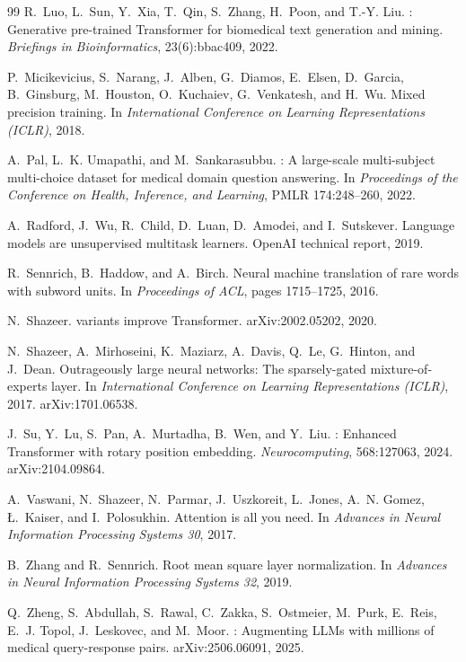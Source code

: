 \documentclass[11pt,a4paper]{article}
\begin{document}
\begin{thebibliography}{99}
R.~Luo, L.~Sun, Y.~Xia, T.~Qin, S.~Zhang, H.~Poon, and T.-Y. Liu.
: Generative pre-trained Transformer for biomedical text generation and mining.
\newblock \emph{Briefings in Bioinformatics}, 23(6):bbac409, 2022.

P.~Micikevicius, S.~Narang, J.~Alben, G.~Diamos, E.~Elsen, D.~Garcia, B.~Ginsburg, M.~Houston, O.~Kuchaiev, G.~Venkatesh, and H.~Wu.
\newblock Mixed precision training.
\newblock In \emph{International Conference on Learning Representations (ICLR)}, 2018.

A.~Pal, L.~K. Umapathi, and M.~Sankarasubbu.
: A large-scale multi-subject multi-choice dataset for medical domain question answering.
\newblock In \emph{Proceedings of the Conference on Health, Inference, and Learning}, PMLR 174:248--260, 2022.

A.~Radford, J.~Wu, R.~Child, D.~Luan, D.~Amodei, and I.~Sutskever.
\newblock Language models are unsupervised multitask learners.
\newblock OpenAI technical report, 2019.

R.~Sennrich, B.~Haddow, and A.~Birch.
\newblock Neural machine translation of rare words with subword units.
\newblock In \emph{Proceedings of ACL}, pages 1715--1725, 2016.

N.~Shazeer.
 variants improve Transformer.
\newblock arXiv:2002.05202, 2020.

N.~Shazeer, A.~Mirhoseini, K.~Maziarz, A.~Davis, Q.~Le, G.~Hinton, and J.~Dean.
\newblock Outrageously large neural networks: The sparsely-gated mixture-of-experts layer.
\newblock In \emph{International Conference on Learning Representations (ICLR)}, 2017. arXiv:1701.06538.

J.~Su, Y.~Lu, S.~Pan, A.~Murtadha, B.~Wen, and Y.~Liu.
: Enhanced Transformer with rotary position embedding.
\newblock \emph{Neurocomputing}, 568:127063, 2024. arXiv:2104.09864.

A.~Vaswani, N.~Shazeer, N.~Parmar, J.~Uszkoreit, L.~Jones, A.~N. Gomez, {\L}.~Kaiser, and I.~Polosukhin.
\newblock Attention is all you need.
\newblock In \emph{Advances in Neural Information Processing Systems 30}, 2017.

B.~Zhang and R.~Sennrich.
\newblock Root mean square layer normalization.
\newblock In \emph{Advances in Neural Information Processing Systems 32}, 2019.

Q.~Zheng, S.~Abdullah, S.~Rawal, C.~Zakka, S.~Ostmeier, M.~Purk, E.~Reis, E.~J. Topol, J.~Leskovec, and M.~Moor.
: Augmenting {LLMs} with millions of medical query-response pairs.
\newblock arXiv:2506.06091, 2025.

\end{thebibliography}
\end{document}
